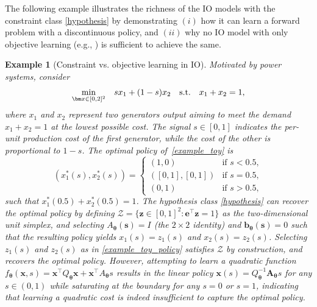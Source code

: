 \documentclass{article}
\theoremstyle{plain}
\newtheorem{example}[theorem]{Example}
\begin{document}
 

The following example illustrates the richness of the IO models with the constraint class \eqref{hypothesis} by demonstrating $(i)$ how it can learn a forward problem with a discontinuous policy, and $(ii)$ why no IO model with only objective learning (e.g., \cite{mohajerin2018data}) is sufficient to achieve the same.

\begin{example}[Constraint vs. objective learning in IO] 
\label{example1}
    Motivated by power systems, consider 
\begin{equation}\label{example_toy}
    \begin{array}{cl}
        \displaystyle\min_{\bm x\in[0,2]^2}
        & sx_1 + (1-s)x_2 \quad {\rm s.t.} \quad  x_1+x_2=1,
    \end{array}
\end{equation}
where $x_1$ and $x_2$ represent two generators output aiming to meet the demand $x_1 + x_2 = 1$ at the lowest possible cost. The signal $s \in [0,1]$ indicates the per-unit production cost of the first generator, while the cost of the other is proportional to $1-s$. The optimal policy of~\eqref{example_toy} is 
\begin{equation}
\label{example_toy_policy}
(x_1^*(s), x_2^*(s)) = 
\begin{cases} 
(1, 0) & \text{if } s < 0.5, \\
([0, 1], [0, 1]) & \text{if } s = 0.5, \\
(0, 1) & \text{if } s > 0.5,
\end{cases}
\end{equation}
such that $x_1^*(0.5) + x_2^*(0.5) = 1$.
The hypothesis class \eqref{hypothesis} can recover the optimal policy by defining $\mathcal{Z} = \{\bm{z} \in [0,1]^2 : \bm{e}^\top \bm{z} = 1\}$ as the two-dimensional unit simplex, and selecting $A_{\bm{\theta}}(\bm{s}) = I$ (the $2\times 2$ identity) and $\bm{b}_{\bm{\theta}}(\bm{s}) = 0$ such that the resulting policy yields $x_1(s) = z_1(s)$ and $x_2(s) = z_2(s)$. Selecting $z_1(s)$ and $z_2(s)$  as in \eqref{example_toy_policy} satisfies $\mathcal{Z}$ by construction, and recovers the optimal policy. 
However, attempting to learn a quadratic function $f_{\bm{\theta}}(\bm{x}, s) = \bm{x}^\top Q_{\bm{\theta}} \bm{x} + \bm{x}^\top A_{\bm{\theta}} s $ results in the linear policy $\bm{x}(s) = Q_{\bm{\theta}}^{-1} \bm A_{\bm{\theta}} s$ for any $s \in (0,1)$ while saturating at the boundary for any $s = 0$ or $s = 1$, indicating that learning a quadratic cost is indeed insufficient to capture the optimal policy.
\end{example}
\end{document}
